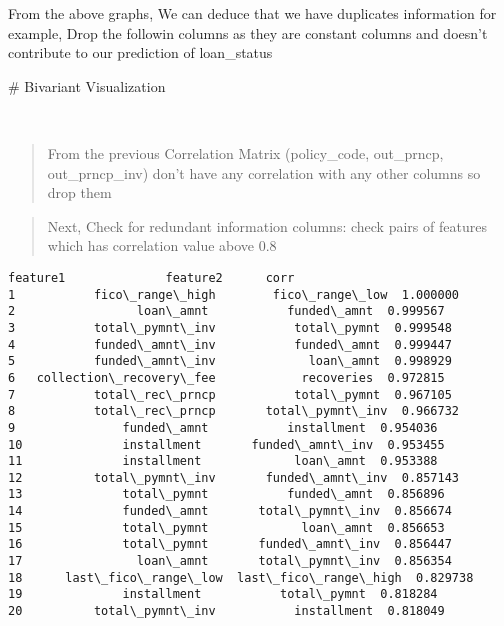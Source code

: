 \documentclass[11pt]{article}
\makeatletter
\newcommand{\boxspacing}{\kern\kvtcb@left@rule\kern\kvtcb@boxsep}
\newcommand{\prompt}[4]{
        {\ttfamily\llap{{\color{#2}[#3]:\hspace{3pt}#4}}\vspace{-\baselineskip}}
    }
\makeatother
\begin{document}
    From the above graphs, We can deduce that we have duplicates information
for example, Drop the followin columns as they are constant columns and
doesn't contribute to our prediction of loan\_status

    \# Bivariant Visualization

    \begin{center}
    \end{center}
    { \hspace*{\fill} \\}
    
    \begin{quote}
From the previous Correlation Matrix (policy\_code, out\_prncp,
out\_prncp\_inv) don't have any correlation with any other columns so
drop them
\end{quote}

    \begin{quote}
Next, Check for redundant information columns: check pairs of features
which has correlation value above 0.8
\end{quote}

            \begin{tcolorbox}[breakable, size=fbox, boxrule=.5pt, pad at break*=1mm, opacityfill=0]
\prompt{Out}{outcolor}{42}{\boxspacing}
\begin{Verbatim}[commandchars=\\\{\}]
                   feature1              feature2      corr
1           fico\_range\_high        fico\_range\_low  1.000000
2                 loan\_amnt           funded\_amnt  0.999567
3           total\_pymnt\_inv           total\_pymnt  0.999548
4           funded\_amnt\_inv           funded\_amnt  0.999447
5           funded\_amnt\_inv             loan\_amnt  0.998929
6   collection\_recovery\_fee            recoveries  0.972815
7           total\_rec\_prncp           total\_pymnt  0.967105
8           total\_rec\_prncp       total\_pymnt\_inv  0.966732
9               funded\_amnt           installment  0.954036
10              installment       funded\_amnt\_inv  0.953455
11              installment             loan\_amnt  0.953388
12          total\_pymnt\_inv       funded\_amnt\_inv  0.857143
13              total\_pymnt           funded\_amnt  0.856896
14              funded\_amnt       total\_pymnt\_inv  0.856674
15              total\_pymnt             loan\_amnt  0.856653
16              total\_pymnt       funded\_amnt\_inv  0.856447
17                loan\_amnt       total\_pymnt\_inv  0.856354
18      last\_fico\_range\_low  last\_fico\_range\_high  0.829738
19              installment           total\_pymnt  0.818284
20          total\_pymnt\_inv           installment  0.818049
\end{Verbatim}
\end{tcolorbox}
        
\end{document}
